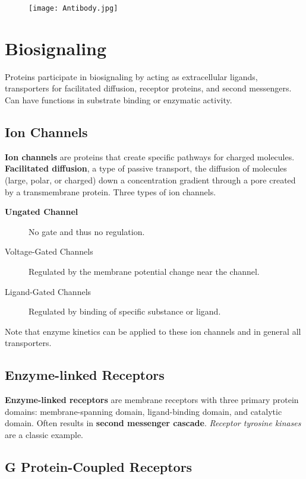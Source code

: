 \documentclass[../Bio_chemistryReview.tex]{subfiles}
\begin{document}
	\begin{figure}[h]
		\centering
		\texttt{[image: Antibody.jpg]}
	\end{figure}
	
	\section{Biosignaling\supdag}
	
	Proteins participate in biosignaling by acting as extracellular ligands, transporters for facilitated diffusion, receptor proteins, and second messengers. Can have functions in substrate binding or enzymatic activity.
	
	\subsection{Ion Channels\supdag}
	
	\textbf{Ion channels} are proteins that create specific pathways for charged molecules. \textbf{Facilitated diffusion}, a type of passive transport, the diffusion of molecules (large, polar, or charged) down a concentration gradient through a pore created by a transmembrane protein. Three types of ion channels.
	
	\begin{description}
		\item[\textbf{Ungated Channel}] 	No gate and thus no regulation.
		\item[Voltage-Gated Channels] 	Regulated by the membrane potential change near the channel.
		\item[Ligand-Gated Channels] Regulated by binding of specific substance or ligand.
	\end{description}
	
	Note that enzyme kinetics can be applied to these ion channels and in general all transporters.
	
	\subsection{Enzyme-linked Receptors\supdag}
	
	\textbf{Enzyme-linked receptors} are membrane receptors with three primary protein domains: membrane-spanning domain, ligand-binding domain, and catalytic domain. Often results in \textbf{second messenger cascade}. \emph{Receptor tyrosine kinases} are a classic example.
	
	\subsection{G Protein-Coupled Receptors\supdag}
	
\end{document}

